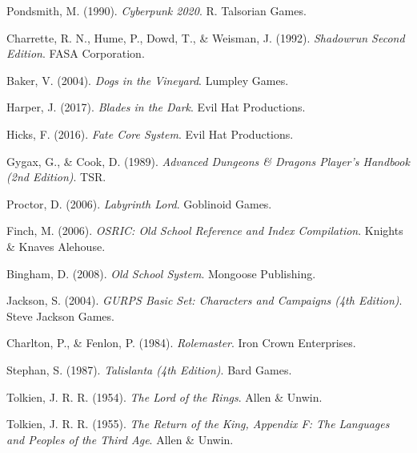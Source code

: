 Pondsmith, M. (1990).
\textit{Cyberpunk 2020}.
R. Talsorian Games.

Charrette, R. N., Hume, P., Dowd, T., \& Weisman, J. (1992).
\textit{Shadowrun Second Edition}.
FASA Corporation.


Baker, V. (2004).
\textit{Dogs in the Vineyard}.
Lumpley Games.

Harper, J. (2017).
\textit{Blades in the Dark}.
Evil Hat Productions.

Hicks, F. (2016).
\textit{Fate Core System}.
Evil Hat Productions.

Gygax, G., \& Cook, D. (1989).
\textit{Advanced Dungeons \& Dragons Player's Handbook (2nd Edition)}.
TSR.

Proctor, D. (2006).
\textit{Labyrinth Lord}.
Goblinoid Games.

Finch, M. (2006).
\textit{OSRIC: Old School Reference and Index Compilation}.
Knights \& Knaves Alehouse.

Bingham, D. (2008).
\textit{Old School System}.
Mongoose Publishing.

Jackson, S. (2004).
\textit{GURPS Basic Set: Characters and Campaigns (4th Edition)}.
Steve Jackson Games.

Charlton, P., \& Fenlon, P. (1984).
\textit{Rolemaster}.
Iron Crown Enterprises.

Stephan, S. (1987).
\textit{Talislanta (4th Edition)}.
Bard Games.

Tolkien, J. R. R. (1954).
\textit{The Lord of the Rings}.
Allen \& Unwin.

Tolkien, J. R. R. (1955).
\textit{The Return of the King, Appendix F: The Languages and Peoples of the Third Age}.
Allen \& Unwin.

